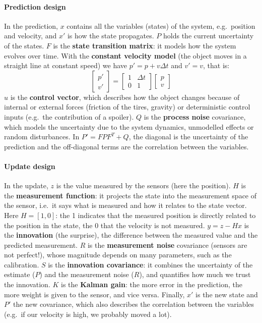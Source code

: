 \paragraph{Prediction design}
In the prediction, $x$ contains all the variables (states) of the system, e.g.\ position and velocity, and $x'$ is how the state propagates.
$P$ holds the current uncertainty of the states.
$F$ is the \textbf{state transition matrix}: it models how the system evolves over time.
With the \textbf{constant velocity model} (the object moves in a straight line at constant speed) we have $p' = p + v\Delta t$ and $v' = v$, that is:
\[
\begin{bmatrix} p' \\ v' \end{bmatrix} = \begin{bmatrix} 1 & \Delta t \\ 0 & 1 \end{bmatrix} \begin{bmatrix} p \\ v \end{bmatrix}
\]
$u$ is the \textbf{control vector}, which describes how the object changes because of internal or external forces (friction of the tires, gravity) or deterministic control inputs (e.g.\ the contribution of a spoiler).
$Q$ is the \textbf{process noise} covariance, which models the uncertainty due to the system dynamics, unmodelled effects or random disturbances.
In $P' = FPF^T + Q$, the diagonal is the uncertainty of the prediction and the off-diagonal terms are the correlation between the variables.

\paragraph{Update design}
In the update, $z$ is the value measured by the sensors (here the position).
$H$ is the \textbf{measurement function}: it projects the state into the measurement space of the sensor, i.e.\ it says what is measured and how it relates to the state vector. Here $H = [1, 0]$: the 1 indicates that the measured position is directly related to the position in the state, the 0 that the velocity is not measured.
$y = z - Hx$ is the \textbf{innovation} (the surprise), the difference between the measured value and the predicted measurement.
$R$ is the \textbf{measurement noise} covariance (sensors are not perfect!), whose magnitude depends on many parameters, such as the calibration.
$S$ is the \textbf{innovation covariance}: it combines the uncertainty of the estimate ($P$) and the measurement noise ($R$), and quantifies how much we trust the innovation.
$K$ is the \textbf{Kalman gain}: the more error in the prediction, the more weight is given to the sensor, and vice versa.
Finally, $x'$ is the new state and $P'$ the new covariance, which also describes the correlation between the variables (e.g.\ if our velocity is high, we probably moved a lot).

